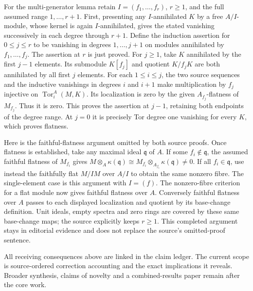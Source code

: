 For the multi-generator lemma retain \(I=(f_1,\ldots,f_r)\), \(r\geq1\), and the full assumed range \(1,\ldots,r+1\). First, presenting any \(I\)-annihilated \(K\) by a free \(A/I\)-module, whose kernel is again \(I\)-annihilated, gives the stated vanishing successively in each degree through \(r+1\). Define the induction assertion for \(0\leq j\leq r\) to be vanishing in degrees \(1,\ldots,j+1\) on modules annihilated by \(f_1,\ldots,f_j\). The assertion at \(r\) is just proved. For \(j\geq1\), take \(K\) annihilated by the first \(j-1\) elements. Its submodule \(K[f_j]\) and quotient \(K/f_jK\) are both annihilated by all first \(j\) elements. For each \(1\leq i\leq j\), the two source sequences and the inductive vanishings in degrees \(i\) and \(i+1\) make multiplication by \(f_j\) injective on \(\operatorname{Tor}_i^A(M,K)\). Its localization is zero by the given \(A_{f_j}\)-flatness of \(M_{f_j}\). Thus it is zero. This proves the assertion at \(j-1\), retaining both endpoints of the degree range. At \(j=0\) it is precisely Tor degree one vanishing for every \(K\), which proves flatness.

Here is the faithful-flatness argument omitted by both source proofs. Once flatness is established, take any maximal ideal \(\mathfrak q\) of \(A\). If some \(f_i\notin\mathfrak q\), the assumed faithful flatness of \(M_{f_i}\) gives \(M\otimes_A\kappa(\mathfrak q)
 \cong M_{f_i}\otimes_{A_{f_i}}\kappa(\mathfrak q)\ne0\). If all \(f_i\in\mathfrak q\), use instead the faithfully flat \(M/IM\) over \(A/I\) to obtain the same nonzero fibre. The single-element case is this argument with \(I=(f)\). The nonzero-fibre criterion for a flat module now gives faithful flatness over \(A\). Conversely faithful flatness over \(A\) passes to each displayed localization and quotient by its base-change definition. Unit ideals, empty spectra and zero rings are covered by these same base-change maps; the source explicitly keeps \(r\geq1\). This completed argument stays in editorial evidence and does not replace the source's omitted-proof sentence.

All receiving consequences above are linked in the claim ledger. The current scope is source-ordered correction accounting and the exact implications it reveals. Broader synthesis, claims of novelty and a combined-results paper remain after the core work.
